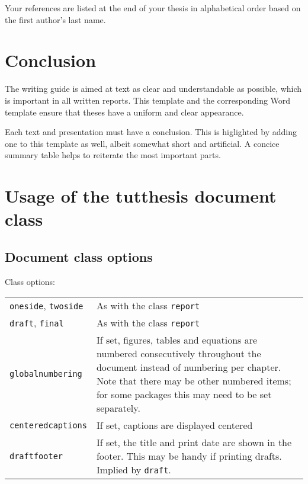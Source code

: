 \documentclass[twoside,draftfooter]{tutthesis} %
\newif\ifnameyear
\begin{document}
Your references are listed at the end of your thesis in alphabetical order based on the first author's last name.



\chapter{Conclusion}
\label{ch:conclusion}

The writing guide is aimed at text as clear and understandable as possible, which is important in all written reports.
This template and the corresponding Word template ensure that theses have a uniform and clear appearance.

Each text and presentation must have a conclusion.
This is higlighted by adding one to this template as well, albeit somewhat short and artificial.
A concice summary table helps to reiterate the most important parts.




\ifnameyear
  
\else
  
\fi





\appendix

\chapter{Usage of the tutthesis document class}
\label{ch:classdocumentation}

\section{Document class options}

Class options:

\begin{tabular}[h]{@{} p{} p{} @{}}
\texttt{oneside}, \texttt{twoside} & As with the class \texttt{report} \\
\texttt{draft}, \texttt{final} & As with the class \texttt{report} \\
\texttt{globalnumbering} & If set, figures, tables and equations are numbered consecutively throughout the document instead of numbering per chapter. Note that there may be other numbered items; for some packages this may need to be set separately. \\
\texttt{centeredcaptions} & If set, captions are displayed centered\\
\texttt{draftfooter} & If set, the title and print date are shown in the footer. This may be handy if printing drafts. Implied by \texttt{draft}.
\end{tabular}
\end{document}

